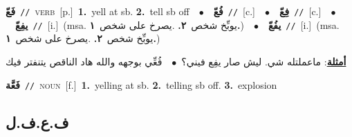 \documentclass[10pt,a4paper,twoside]{article} %
\begin{document}
\begin{multicols}{2}
{\setlength\topsep{0pt}\textbf{\foreignlanguage{arabic}{فَعّ}}\ {\color{gray}\texttt{//}\color{black}}\ \textsc{verb}\ [p.]\ \textbf{1.}~yell at sb.  \textbf{2.}~tell sb off\ \ $\bullet$\ \ \setlength\topsep{0pt}\textbf{\foreignlanguage{arabic}{فُعّ}}\ {\color{gray}\texttt{//}\color{black}}\ [c.]\ \ $\bullet$\ \ \setlength\topsep{0pt}\textbf{\foreignlanguage{arabic}{فِعّ}}\ {\color{gray}\texttt{//}\color{black}}\ [c.]\ \ $\bullet$\ \ \setlength\topsep{0pt}\textbf{\foreignlanguage{arabic}{يفِعّ}}\ {\color{gray}\texttt{//}\color{black}}\ [i.]\ \color{gray}(msa. \foreignlanguage{arabic}{يوبِّخ شخص}~\foreignlanguage{arabic}{\textbf{٢.}}  .\foreignlanguage{arabic}{يصرخ على شخص}~\foreignlanguage{arabic}{\textbf{١.}})\color{black}\ \ $\bullet$\ \ \setlength\topsep{0pt}\textbf{\foreignlanguage{arabic}{يفُعّ}}\ {\color{gray}\texttt{//}\color{black}}\ [i.]\ \color{gray}(msa. \foreignlanguage{arabic}{يوبِّخ شخص}~\foreignlanguage{arabic}{\textbf{٢.}}  .\foreignlanguage{arabic}{يصرخ على شخص}~\foreignlanguage{arabic}{\textbf{١.}})\color{black}\  \begin{flushright}\color{gray}\foreignlanguage{arabic}{\textbf{\underline{\foreignlanguage{arabic}{أمثلة}}}: ماعملتله شي. ليش صار يفِع فيني؟\ $\bullet$\ \  فُعِّي بوجهه والله هاد الناقص يتنفتر فيك}\end{flushright}\color{black}} \vspace{2mm}

{\setlength\topsep{0pt}\textbf{\foreignlanguage{arabic}{فَعَّة}}\ {\color{gray}\texttt{//}\color{black}}\ \textsc{noun}\ [f.]\ \textbf{1.}~yelling at sb.  \textbf{2.}~telling sb off.  \textbf{3.}~explosion\ } \vspace{2mm}

\vspace{-3mm}
\subsection*{\color{blue}\foreignlanguage{arabic}{ف.ع.ف.ل}\color{blue}{}} 


\end{multicols}
\end{document}
